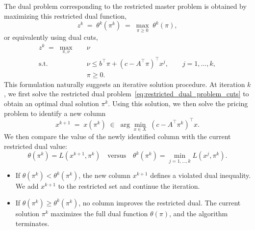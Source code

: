 \documentclass{book}
\theoremstyle{definition}
\newcounter{algorithm_}
\numberwithin{algorithm_}{chapter}
\begin{document}
The dual problem corresponding to the restricted master problem is obtained by maximizing this restricted dual function,
\[
z^k
\;=\; \theta^k(\pi^k) \;=\;
\max_{\pi \ge 0}
\;
\theta^k(\pi),
\]
or equivalently using dual cuts,
\begin{subequations} \label{eq:restricted_dual_problem_cuts}
\begin{align}
z^k
\;=\;
\max_{\pi,\nu}
\quad & \nu
\label{eq:restricted_dual_problem_cuts_obj}
\\
\text{s.t.} \quad
& \nu 
\le
b^\top \pi 
+
(c - A^\top \pi)^\top x^j,
\qquad
j = 1,\dots,k,
\label{eq:restricted_dual_problem_cuts_constr}
\\
& \pi \ge 0.
\label{eq:restricted_dual_problem_cuts_nonneg}
\end{align}
\end{subequations}
This formulation naturally suggests an iterative solution procedure. At iteration $k$, we first solve the restricted dual problem~\eqref{eq:restricted_dual_problem_cuts} to obtain an optimal dual solution $\pi^k$. Using this solution, we then solve the pricing problem to identify a new column
\[
x^{k+1} \; = \; x(\pi^k) \; \in \;
\arg\min_{x \in X}
\;
(c - A^\top \pi^k)^\top x.
\]
We then compare the value of the newly identified column with the current restricted dual value:
\[
\theta(\pi^k) = L(x^{k+1}, \pi^k) \quad \text{versus} \quad \theta^k(\pi^k) = \min_{j=1,\dots,k} L(x^j, \pi^k).
\]

\begin{itemize}
    \item If $\theta(\pi^k) < \theta^k(\pi^k)$, the new column $x^{k+1}$ defines a violated dual inequality. We add $x^{k+1}$ to the restricted set and continue the iteration.
    \item If $\theta(\pi^k) \geq \theta^k(\pi^k)$, no column improves the restricted dual. The current solution $\pi^k$ maximizes the full dual function $\theta(\pi)$, and the algorithm terminates.
\end{itemize}
\end{document}
